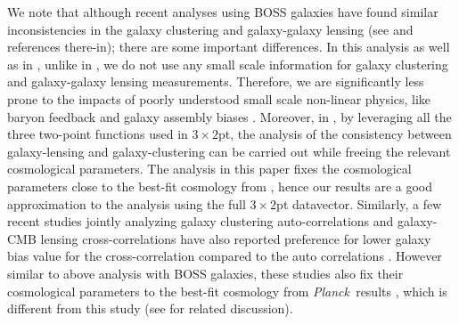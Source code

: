 \documentclass[aps, prd,twocolumn,superscriptaddress,nofootinbib,preprintnumbers]{revtex4-1}
\newcommand{\redmagic}{\texttt{redMaGiC} }
\newcommand{\Planck}{{\slshape Planck~}}
\begin{document}
We note that although recent analyses using BOSS galaxies have found similar inconsistencies in the galaxy clustering and galaxy-galaxy lensing (see \citep{Leauthaud_2017, Lange_2021} and references there-in); there are some important differences. In this analysis as well as in \citet{y3-3x2ptkp}, unlike in \citet{Leauthaud_2017}, we do not use any small scale information for galaxy clustering and galaxy-galaxy lensing measurements. Therefore, we are significantly less prone to the impacts of poorly understood small scale non-linear physics, like baryon feedback and galaxy assembly biases \citep{Yuan_2020, Amodeo_2021, zu2020lensing}. Moreover, in \citet{y3-3x2ptkp}, by leveraging all the three two-point functions used in $3\times2$pt, the analysis of the consistency between galaxy-lensing and galaxy-clustering can be carried out while freeing the relevant cosmological parameters. The analysis in this paper fixes the cosmological parameters close to the best-fit cosmology from \citet{y3-3x2ptkp}, hence our results are a good approximation to the analysis using the full $3\times2$pt datavector. Similarly, a few recent studies jointly analyzing galaxy clustering auto-correlations and galaxy-CMB lensing cross-correlations have also reported preference for lower galaxy bias value for the cross-correlation compared to the auto correlations \citep{Hang_2020, Kitanidis_2020}. However similar to above analysis with BOSS galaxies, these studies also fix their cosmological parameters to the best-fit cosmology from \Planck results \citep{Planck_2018_cosmo}, which is different from this study (see \citep{krolewski2021cosmological} for related discussion).  
\end{document}
